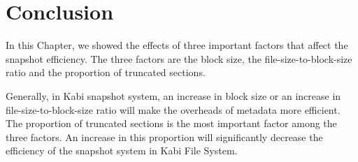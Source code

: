 \section{Conclusion}

    In this Chapter, we showed the effects of three important factors that affect the snapshot efficiency. The three factors are the block size, the file-size-to-block-size ratio and the proportion of truncated sections.

    Generally, in Kabi snapshot system, an increase in block size or an increase in file-size-to-block-size ratio will make the overheads of metadata more efficient. The proportion of truncated sections is the most important factor among the three factors. An increase in this proportion will significantly decrease the efficiency of the snapshot system in Kabi File System.

